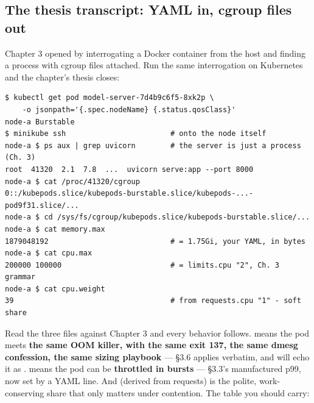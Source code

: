 \subsection*{The thesis transcript: YAML in, cgroup files out}

Chapter 3 opened by interrogating a Docker container from the host and finding a process with cgroup files attached. Run the same interrogation on Kubernetes and the chapter's thesis closes:

\begin{terminalbox}
\begin{Verbatim}[breaklines=true,breakanywhere=true,fontsize=\small,formatcom=\color{tbbtermfg},codes=\tbbcodeactive]
$ kubectl get pod model-server-7d4b9c6f5-8xk2p \
    -o jsonpath='{.spec.nodeName} {.status.qosClass}'
node-a Burstable
$ minikube ssh                        # onto the node itself
node-a $ ps aux | grep uvicorn        # the server is just a process (Ch. 3)
root  41320  2.1  7.8  ...  uvicorn serve:app --port 8000
node-a $ cat /proc/41320/cgroup
0::/kubepods.slice/kubepods-burstable.slice/kubepods-...-pod9f31.slice/...
node-a $ cd /sys/fs/cgroup/kubepods.slice/kubepods-burstable.slice/...
node-a $ cat memory.max
1879048192                            # = 1.75Gi, your YAML, in bytes
node-a $ cat cpu.max
200000 100000                         # = limits.cpu "2", Ch. 3 grammar
node-a $ cat cpu.weight
39                                    # from requests.cpu "1" - soft share
\end{Verbatim}
\end{terminalbox}

Read the three files against Chapter 3 and every behavior follows.  means the pod meets \textbf{the same OOM killer, with the same exit 137, the same dmesg confession, the same sizing playbook} — §3.6 applies verbatim, and  will echo it as .  means the pod can be \textbf{throttled in bursts} — §3.3's manufactured p99, now set by a YAML line. And  (derived from requests) is the polite, work-conserving share that only matters under contention. The table you should carry:

